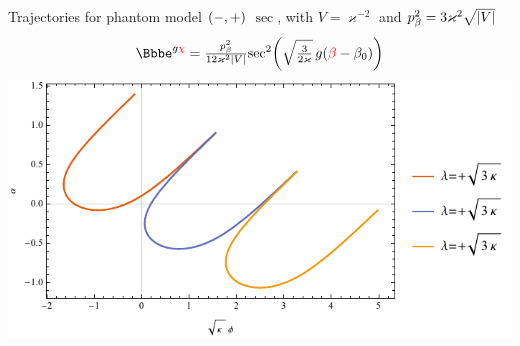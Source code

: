 \documentclass[8pt]{beamer}
\begin{document}
\begin{frame}%
{Trajectories for phantom model ${\left(-,+\right)}$}%
{$\sec$, with $V = \varkappa^{-2}$ and
$p_\beta^2 = 3\varkappa^2\sqrt{{\left|V\right|}}$}
\begin{align}
\ee^{g\textcolor{red}{\chi}} = 
\tfrac{p_\beta^2}{12\varkappa^2\vbr{V}}
\rfun{\sec^2}{ \sqrt{\tfrac{3}{2\varkappa}}\,g 
\rbr{\textcolor{red}{\beta}-\beta_0}}
\end{align}
\includegraphics[width=\textwidth]{../plots.nb/csc_lamb_l.pdf}

\end{frame}
\end{document}
